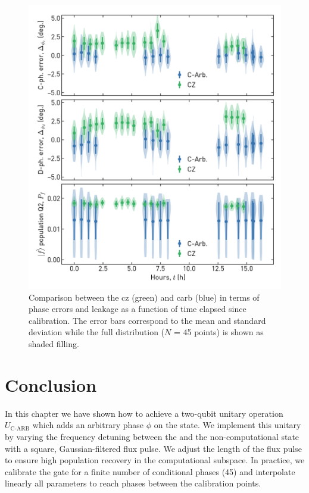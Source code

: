 \begin{figure}[ht]
    \centering
    \includegraphics[width=\textwidth]{chapters/carb_gate/figs/ch4_characterization_drift_20200124_175455.png}
    \caption{Comparison between the \gls{cz} (green) and \gls{carb} (blue) in terms of phase errors and leakage as a function of time elapsed since calibration. The error bars correspond to the mean and standard deviation while the full distribution ($N$ = 45 points) is shown as shaded filling.}
    \label{fig:carb_characterization_drift}
\end{figure}

\section{Conclusion}
 In this chapter we have shown how to achieve a two-qubit unitary operation $U_{\textrm{C-ARB}}$ which adds an arbitrary phase $\phi$ on the \oo{} state. We implement this unitary by varying the frequency detuning between the \oo{} and the non-computational \tz{} state with a square,  Gaussian-filtered flux pulse. We adjust the length of the flux pulse to ensure high population recovery in the computational subspace. In practice, we calibrate the gate for a finite number of conditional phases (45) and interpolate linearly all parameters to reach phases between the calibration points. 
 
